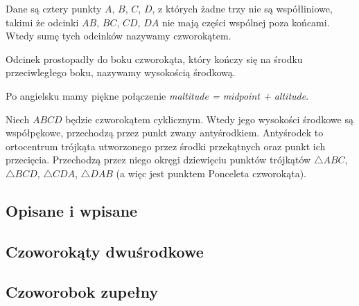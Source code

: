%

\begin{definition}[czworokąt]
%
	Dane są cztery punkty $A$, $B$, $C$, $D$, z których żadne trzy nie są współliniowe, takimi że odcinki $AB$, $BC$, $CD$, $DA$ nie mają części wspólnej poza końcami.
    Wtedy sumę tych odcinków nazywamy czworokątem.	
\end{definition}



\begin{definition}
	Odcinek prostopadły do boku czworokąta, który kończy się na środku przeciwległego boku, nazywamy wysokością środkową.
\end{definition}

Po angielsku mamy piękne połączenie \emph{maltitude = midpoint + altitude}.

\begin{proposition} %
	Niech $ABCD$ będzie czworokątem cyklicznym.
	Wtedy jego wysokości środkowe są współpękowe, przechodzą przez punkt zwany antyśrodkiem.
%
	Antyśrodek to ortocentrum trójkąta utworzonego przez środki przekątnych oraz punkt ich przecięcia.
	Przechodzą przez niego okręgi dziewięciu punktów trójkątów $\triangle ABC$, $\triangle BCD$, $\triangle CDA$, $\triangle DAB$ (a więc jest punktem Ponceleta czworokąta).
\end{proposition}

\subsection{Opisane i wpisane}


\subsection{Czoworokąty dwuśrodkowe}


%
%
\subsection{Czoworobok zupełny}

%



